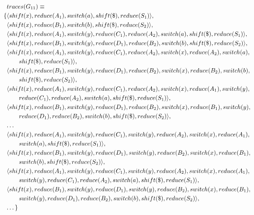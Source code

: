 \documentclass[envcountsame,runningheads]{llncs}
\begin{document}
{\small\parbox{\textwidth}{\begin{align*}
&traces(G_{11}) \equiv \\
\{ & \langle shift(x), reduce(A_1), switch(a), shift(\$), reduce(S_1) \rangle,\\
   & \langle shift(x), reduce(B_1), switch(b), shift(\$), reduce(S_2) \rangle,\\
   & \langle shift(x), reduce(A_1), switch(y), reduce(C_1), reduce(A_2), switch(a), shift(\$), reduce(S_1) \rangle,\\
   & \langle shift(x), reduce(B_1), switch(y), reduce(D_1), reduce(B_2), switch(b), shift(\$), reduce(S_2) \rangle,\\
   & \langle shift(x), reduce(A_1), switch(y), reduce(C_1), reduce(A_2), switch(x), reduce(A_2), switch(a), \\ & \qquad shift(\$), reduce(S_1) \rangle,\\
   & \langle shift(x), reduce(B_1), switch(y), reduce(D_1), reduce(B_2), switch(x), reduce(B_2), switch(b), \\ & \qquad shift(\$), reduce(S_2) \rangle,\\
   & \langle shift(x), reduce(A_1), switch(y), reduce(C_1), reduce(A_2), switch(x), reduce(A_1), switch(y), \\ & \qquad reduce(C_1), reduce(A_2), switch(a), shift(\$), reduce(S_1) \rangle,\\
   & \langle shift(x), reduce(B_1), switch(y), reduce(D_1), reduce(B_2), switch(x), reduce(B_1), switch(y), \\ & \qquad reduce(D_1), reduce(B_2), switch(b), shift(\$), reduce(S_2) \rangle,\\
   & \textellipsis \\
   & \langle shift(x), reduce(A_1), switch(y), reduce(C_1), switch(y), reduce(A_2), switch(x), reduce(A_1), \\ & \qquad switch(a), shift(\$), reduce(S_1) \rangle,\\
   & \langle shift(x), reduce(B_1), switch(y), reduce(D_1), switch(y), reduce(B_2), switch(x), reduce(B_1), \\ & \qquad switch(b), shift(\$), reduce(S_2) \rangle,\\
   & \langle shift(x), reduce(A_1), switch(y), reduce(C_1), switch(y), reduce(A_2), switch(x), reduce(A_1), \\ & \qquad switch(y), reduce(C_1), reduce(A_2), switch(a), shift(\$), reduce(S_1) \rangle,\\
   & \langle shift(x), reduce(B_1), switch(y), reduce(D_1), switch(y), reduce(B_2), switch(x), reduce(B_1), \\ & \qquad switch(y), reduce(D_1), reduce(B_2), switch(b), shift(\$), reduce(S_2) \rangle,\\
   & \textellipsis \}
\end{align*}}}
\end{document}
